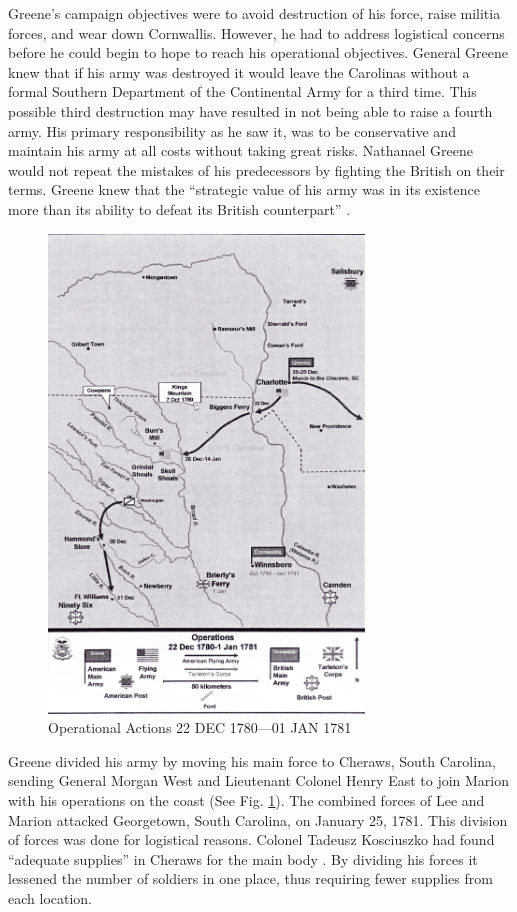 Greene’s campaign objectives were to avoid destruction of his force, raise
militia forces, and wear down Cornwallis.  However, he had to address logistical
concerns before he could begin to hope to reach his operational objectives.
General Greene knew that if his army was destroyed it would leave the Carolinas
without a formal Southern Department of the Continental Army for a third time.
This possible third destruction may have resulted in not being able to raise a
fourth army.  His primary responsibility as he saw it, was to be conservative
and maintain his army at all costs without taking great risks. Nathanael Greene
would not repeat the mistakes of his predecessors by fighting the British on
their terms.   Greene knew that the “strategic value of his army was in its
existence more than its ability to defeat its British counterpart”
\cite[p.66]{woodward_comparative_2002}.

\begin{figure}[h]
\begin{center}
\includegraphics[height=5in]{gfx/Nicholson4}
\end{center}
\caption{Operational Actions 22 DEC 1780---01 JAN 1781 \cite[Tab D, Map 6]{rauch_battle_2007}}
\label{Nicholson4}
\end{figure}

Greene divided his army by moving his main force to Cheraws, South Carolina,
sending General Morgan West and Lieutenant Colonel Henry East to join Marion
with his operations on the coast (See Fig. \ref{Nicholson4}).  The combined
forces of Lee and Marion attacked Georgetown, South Carolina, on January 25, 1781.  This
division of forces was done for logistical reasons.  Colonel Tadeusz Kosciuszko
had found “adequate supplies” in Cheraws for the main body \cite[p.23]{moncure_cowpens_1996}.
By dividing his forces it lessened the number of soldiers in one place, thus
requiring fewer supplies from each location.  

